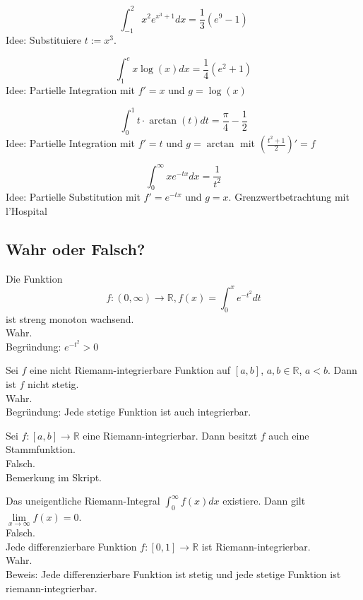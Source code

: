 \documentclass[parskip=full]{scrartcl}
\begin{document}
\begin{displaymath}
  \int_{-1}^{2} x^2 e^{x^3 + 1} dx = \frac{1}{3} \left(e^9 - 1\right)
\end{displaymath}
Idee: Substituiere $t := x^3$.

\begin{displaymath}
  \int_{1}^{e} x \log(x) dx = \frac{1}{4} \left(e^2 + 1\right)
\end{displaymath}
Idee: Partielle Integration mit $f' = x$ und $g = \log(x)$

\begin{displaymath}
  \int_{0}^{1} t \cdot \arctan(t) dt = \frac{\pi}{4} - \frac{1}{2}
\end{displaymath}
Idee: Partielle Integration mit $f' = t$ und $g = \arctan$ mit $\left(\frac{t^2 + 1}{2}\right)' = f$

\begin{displaymath}
  \int_{0}^{\infty} xe^{-tx} dx = \frac{1}{t^2}
\end{displaymath}
Idee: Partielle Substitution mit $f' = e^{-tx}$ und $g = x$. Grenzwertbetrachtung mit l'Hospital

\subsection{Wahr oder Falsch?}
Die Funktion
\begin{displaymath}
  f: (0,\infty) \to \mathbb{R}, f(x) = \int_{0}^{x} e^{-t^2}dt
\end{displaymath}
ist streng monoton wachsend.\\
Wahr.\\
Begründung: $e^{-t^2} > 0$

Sei $f$ eine nicht Riemann-integrierbare Funktion auf $[a,b]$, $a,b \in \mathbb{R}$, $a < b$.
Dann ist $f$ nicht stetig.\\
Wahr.\\
Begründung: Jede stetige Funktion ist auch integrierbar.

Sei $f:[a,b] \to \mathbb{R}$ eine Riemann-integrierbar.
Dann besitzt $f$ auch eine Stammfunktion.\\
Falsch.\\
Bemerkung im Skript.

Das uneigentliche Riemann-Integral $\int_{0}^{\infty} f(x)dx$ existiere.
Dann gilt $\lim\limits_{x \to \infty} f(x) = 0$.\\
Falsch.\\

Jede differenzierbare Funktion $f:[0,1] \to \mathbb{R}$ ist Riemann-integrierbar.\\
Wahr.\\
Beweis: Jede differenzierbare Funktion ist stetig und jede stetige Funktion ist riemann-integrierbar.
\end{document}

